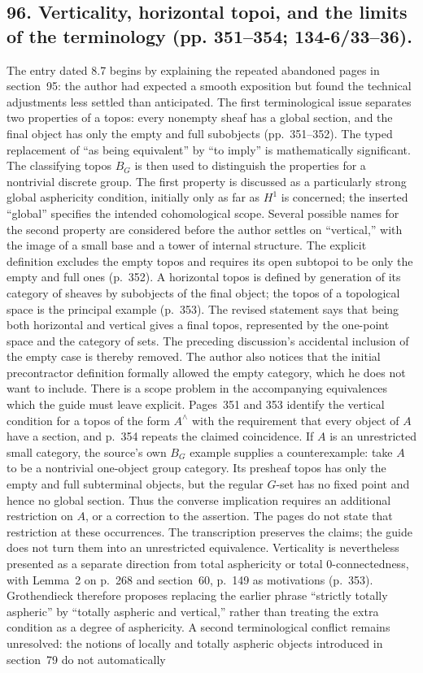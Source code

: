 \documentclass[10pt,oneside]{book}
\begin{document}
\subsection*{96. Verticality, horizontal topoi, and the limits of the terminology (pp. 351--354; 134-6/33--36).}
The entry dated 8.7 begins by explaining the repeated abandoned pages in section~95: the author had expected a smooth exposition but found the technical adjustments less settled than anticipated. The first terminological issue separates two properties of a topos: every nonempty sheaf has a global section, and the final object has only the empty and full subobjects (pp.~351--352). The typed replacement of ``as being equivalent'' by ``to imply'' is mathematically significant. The classifying topos $B_G$ is then used to distinguish the properties for a nontrivial discrete group. The first property is discussed as a particularly strong global asphericity condition, initially only as far as $H^1$ is concerned; the inserted ``global'' specifies the intended cohomological scope. Several possible names for the second property are considered before the author settles on ``vertical,'' with the image of a small base and a tower of internal structure. The explicit definition excludes the empty topos and requires its open subtopoi to be only the empty and full ones (p.~352). A horizontal topos is defined by generation of its category of sheaves by subobjects of the final object; the topos of a topological space is the principal example (p.~353). The revised statement says that being both horizontal and vertical gives a final topos, represented by the one-point space and the category of sets. The preceding discussion's accidental inclusion of the empty case is thereby removed. The author also notices that the initial precontractor definition formally allowed the empty category, which he does not want to include. There is a scope problem in the accompanying equivalences which the guide must leave explicit. Pages~351 and 353 identify the vertical condition for a topos of the form $A^{\wedge}$ with the requirement that every object of $A$ have a section, and p.~354 repeats the claimed coincidence. If $A$ is an unrestricted small category, the source's own $B_G$ example supplies a counterexample: take $A$ to be a nontrivial one-object group category. Its presheaf topos has only the empty and full subterminal objects, but the regular $G$-set has no fixed point and hence no global section. Thus the converse implication requires an additional restriction on $A$, or a correction to the assertion. The pages do not state that restriction at these occurrences. The transcription preserves the claims; the guide does not turn them into an unrestricted equivalence. Verticality is nevertheless presented as a separate direction from total asphericity or total 0-connectedness, with Lemma~2 on p.~268 and section~60, p.~149 as motivations (p.~353). Grothendieck therefore proposes replacing the earlier phrase ``strictly totally aspheric'' by ``totally aspheric and vertical,'' rather than treating the extra condition as a degree of asphericity. A second terminological conflict remains unresolved: the notions of locally and totally aspheric objects introduced in section~79 do not automatically 
\end{document}
